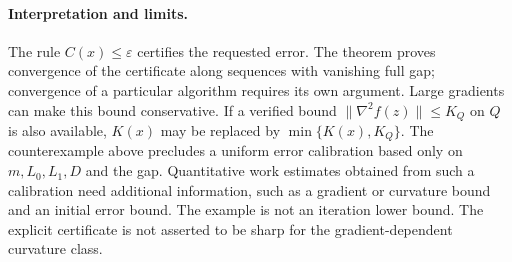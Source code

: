 \paragraph{Interpretation and limits.}
The rule $C(x)\le\varepsilon$ certifies the requested error.
The theorem proves convergence of the certificate along sequences with
vanishing full gap; convergence of a particular algorithm requires its
own argument. Large gradients can make this bound conservative. If a
verified bound $\|\nabla^2f(z)\|\le K_Q$ on $Q$ is also available,
$K(x)$ may be replaced by $\min\{K(x),K_Q\}$. The counterexample above
precludes a uniform error calibration based only on
$m,L_0,L_1,D$ and the gap. Quantitative work estimates obtained from
such a calibration need additional information, such as a gradient
or curvature bound and an initial error bound. The example is not an
iteration lower bound. The explicit certificate is not asserted to be
sharp for the gradient-dependent curvature class.
